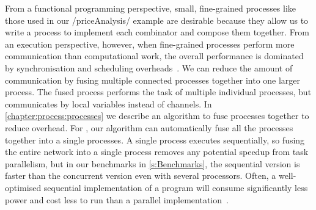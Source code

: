
From a functional programming perspective, small, fine-grained processes like those used in our \Hs/priceAnalysis/ example are desirable because they allow us to write a process to implement each combinator and compose them together.
From an execution perspective, however, when fine-grained processes perform more communication than computational work, the overall performance is dominated by synchronisation and scheduling overheads~\cite{chen1990impact}.
We can reduce the amount of communication by fusing multiple connected processes together into one larger process.
The fused process performs the task of multiple individual processes, but communicates by local variables instead of channels.
In \cref{chapter:process:processes} we describe an algorithm to fuse processes together to reduce overhead.
For \Hs@priceAnalysis@, our algorithm can automatically fuse all the processes together into a single processes.
A single process executes sequentially, so fusing the entire network into a single process removes any potential speedup from task parallelism, but in our benchmarks in \cref{s:Benchmarks}, the sequential version is faster than the concurrent version even with several processors.
Often, a well-optimised sequential implementation of a program will consume significantly less power and cost less to run than a parallel implementation~\cite{mcsherry2015scalability}.


